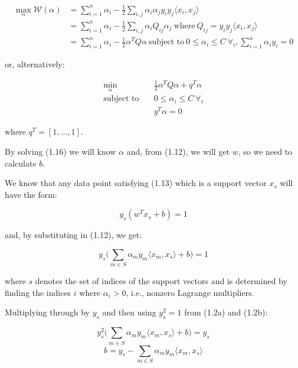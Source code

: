 \begin{align*}
    \max_{\alpha} \mathcal{W}(\alpha) &= \sum_{i=1}^{n}\alpha_i - \frac{1}{2}\sum_{i,j}\alpha_i\alpha_j y_i y_j \langle x_i, x_j \rangle \\
    &= \sum_{i=1}^{n}\alpha_i - \frac{1}{2}\sum_{i,j}\alpha_i Q_{ij}\alpha_j \ \text{where} \ Q_{ij} = y_i y_j \langle x_i, x_j \rangle \\
    &= \sum_{i=1}^{n}\alpha_i - \frac{1}{2}\alpha^T Q\alpha \ \text{subject to} \ 0\leq\alpha_i\leq C \ \forall_i, \sum_{i=1}^{n}\alpha_i y_i=0 \tag{1.15}
\end{align*}

or, alternatively:

\begin{equation}
    \begin{aligned}
        \min_{\alpha} \quad & \frac{1}{2}\alpha^T Q\alpha+q^T\alpha \\
            \textrm{subject to} \quad & 0\leq\alpha_i\leq C \ \forall_i \\ & y^T\alpha=0
    \end{aligned} \tag{1.16}
\end{equation}

where $q^T = [1, \dots, 1]$.

By solving (1.16) we will know $\alpha$ and, from (1.12), we will get $w$, so we need to calculate $b.$

We know that any data point satisfying (1.13) which is a support vector $x_s$ will have the form:

\begin{equation}
	y_s(w^T x_s + b)=1 \tag{1.17}
\end{equation}

and, by substituting in (1.12), we get:

\begin{equation}
	y_s\big(\sum_{m\in S}\alpha_m y_m \langle x_m, x_s \rangle +b\big)=1 \tag{1.18}
\end{equation}

where $s$ denotes the set of indices of the support vectors and is determined by finding the indices $i$ where $\alpha_i>0$, i.e., nonzero Lagrange multipliers.

Multiplying through by $y_s$ and then using $y_s^2=1$ from (1.2a) and (1.2b):

\begin{equation}
	y_s^2\big(\sum_{m\in S}\alpha_m y_m \langle x_m, x_s \rangle +b\big)=y_s \tag{1.19}
\end{equation}
\begin{equation}
	b=y_s-\sum_{m\in S}\alpha_m y_m \langle x_m, x_s \rangle \tag{1.20}
\end{equation}


